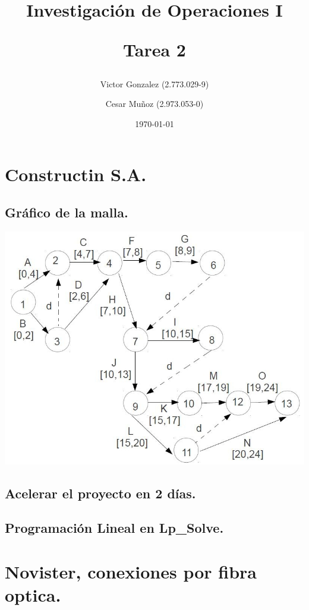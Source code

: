 \documentclass[12pt,letterpaper]{article}
\begin{document}
\title{Investigación de Operaciones I \\ \begin{Large}Tarea 2\end{Large}} 
\author{Victor Gonzalez (2.773.029-9)
\and Cesar Muñoz (2.973.053-0)}
\date{\today}
\maketitle


\section{Constructin S.A.}
\subsection{Gráfico de la malla.}
\includegraphics[angle=90]{./src/malla_parte1.jpg}
\subsection{Acelerar el proyecto en 2 días.}

\subsection{Programación Lineal en Lp\_Solve.}



\section{Novister, conexiones por fibra optica.}
\end{document}
